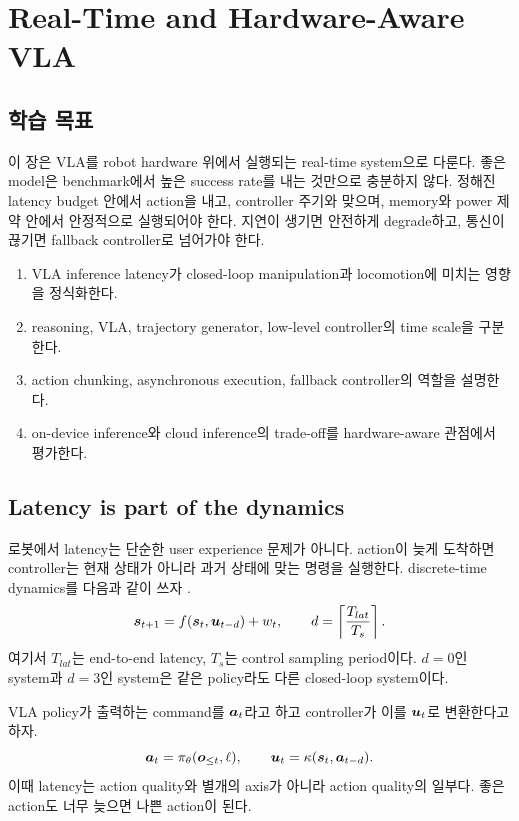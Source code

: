\chapter{Real-Time and Hardware-Aware VLA}

\section*{학습 목표}

이 장은 VLA를 robot hardware 위에서 실행되는 real-time system으로 다룬다. 좋은 model은 benchmark에서 높은 success rate를 내는 것만으로 충분하지 않다. 정해진 latency budget 안에서 action을 내고, controller 주기와 맞으며, memory와 power 제약 안에서 안정적으로 실행되어야 한다. 지연이 생기면 안전하게 degrade하고, 통신이 끊기면 fallback controller로 넘어가야 한다.

\begin{enumerate}
  \item VLA inference latency가 closed-loop manipulation과 locomotion에 미치는 영향을 정식화한다.
  \item reasoning, VLA, trajectory generator, low-level controller의 time scale을 구분한다.
  \item action chunking, asynchronous execution, fallback controller의 역할을 설명한다.
  \item on-device inference와 cloud inference의 trade-off를 hardware-aware 관점에서 평가한다.
\end{enumerate}

\section{Latency is part of the dynamics}

로봇에서 latency는 단순한 user experience 문제가 아니다. action이 늦게 도착하면 controller는 현재 상태가 아니라 과거 상태에 맞는 명령을 실행한다. discrete-time dynamics를 다음과 같이 쓰자 \cite{mayne2000,predictivesafetyfilter2021}.
\begin{equation}
  \bm{s}_{t+1}
  =
  f(\bm{s}_t,\bm{u}_{t-d}) + w_t,
  \qquad
  d
  =
  \left\lceil
  \frac{T_{lat}}{T_s}
  \right\rceil .
  \label{eq:ch18-delayed-dynamics}
\end{equation}
여기서 $T_{lat}$는 end-to-end latency, $T_s$는 control sampling period이다. $d=0$인 system과 $d=3$인 system은 같은 policy라도 다른 closed-loop system이다.

VLA policy가 출력하는 command를 $\bm{a}_t$라고 하고 controller가 이를 $\bm{u}_t$로 변환한다고 하자.
\begin{equation}
  \bm{a}_t
  =
  \pi_{\theta}(\bm{o}_{\leq t},\ell),
  \qquad
  \bm{u}_t
  =
  \kappa(\bm{s}_t,\bm{a}_{t-d}).
  \label{eq:ch18-policy-controller-delay}
\end{equation}
이때 latency는 action quality와 별개의 axis가 아니라 action quality의 일부다. 좋은 action도 너무 늦으면 나쁜 action이 된다.

